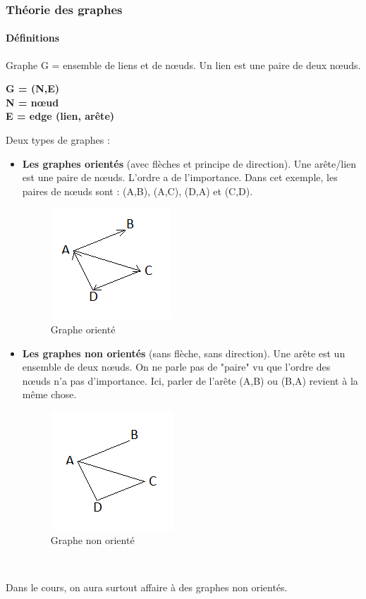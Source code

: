 \subsubsection{Théorie des graphes}
\paragraph{Définitions\\}
Graphe G = ensemble de liens et de nœuds. Un lien est une paire de deux nœuds.
\begin{center}
\textbf{
G = (N,E)\\
N = nœud\\
E = edge (lien, arête)\\
}
\end{center}
Deux types de graphes :
\begin{itemize}

\item \textbf{Les graphes orientés} (avec flèches et principe de direction). Une arête/lien est une paire de nœuds. L'ordre a de l'importance. Dans cet exemple, les paires de nœuds sont : (A,B), (A,C), (D,A) et (C,D). 
\begin{figure}[!h]
\centering
\includegraphics[scale=1]{images/17_oriente.png}
\caption{Graphe orienté}
\end{figure}
\item \textbf{Les graphes non orientés} (sans flèche, sans direction). Une arête est un ensemble de deux nœuds. On ne parle pas de "paire" vu que l'ordre des nœuds n'a pas d'importance. Ici, parler de l'arête (A,B) ou (B,A) revient à la même chose.
\begin{figure}[!h]
\centering
\includegraphics[scale=1]{images/17_non-oriente.png}
\caption{Graphe non orienté}
\end{figure}
\\
\end{itemize}
Dans le cours, on aura surtout affaire à des graphes non orientés.


